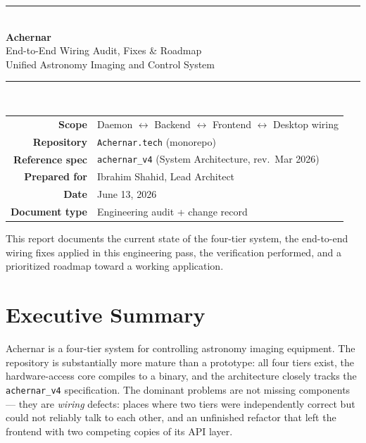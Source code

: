 \documentclass[11pt]{article}
\begin{document}
\begin{titlepage}
\centering
\vspace*{1.4cm}
{\color{acnavy}\rule{\linewidth}{1.4pt}}\\[0.5cm]
{\Huge\bfseries\color{acnavy} Achernar}\\[0.35cm]
{\LARGE\color{acblue} End-to-End Wiring Audit, Fixes \& Roadmap}\\[0.4cm]
{\large\color{acgray} Unified Astronomy Imaging and Control System}\\[0.3cm]
{\color{acnavy}\rule{\linewidth}{1.4pt}}\\[1.0cm]

\begin{tabular}{rl}
\textbf{Scope} & Daemon $\leftrightarrow$ Backend $\leftrightarrow$ Frontend $\leftrightarrow$ Desktop wiring \\[2pt]
\textbf{Repository} & \texttt{Achernar.tech} (monorepo) \\[2pt]
\textbf{Reference spec} & \texttt{achernar\_v4} (System Architecture, rev.\ Mar 2026) \\[2pt]
\textbf{Prepared for} & Ibrahim Shahid, Lead Architect \\[2pt]
\textbf{Date} & June 13, 2026 \\[2pt]
\textbf{Document type} & Engineering audit + change record \\
\end{tabular}

\vfill
{\color{acgray}\small This report documents the current state of the four-tier system,
the end-to-end wiring fixes applied in this engineering pass, the verification performed,
and a prioritized roadmap toward a working application.}
\vspace*{1cm}
\end{titlepage}

\tableofcontents
\newpage

\section{Executive Summary}

Achernar is a four-tier system for controlling astronomy imaging equipment. The repository
is substantially more mature than a prototype: all four tiers exist, the hardware-access core
compiles to a binary, and the architecture closely tracks the \texttt{achernar\_v4} specification.
The dominant problems are not missing components --- they are \emph{wiring} defects: places where
two tiers were independently correct but could not reliably talk to each other, and an unfinished
refactor that left the frontend with two competing copies of its API layer.
\end{document}

